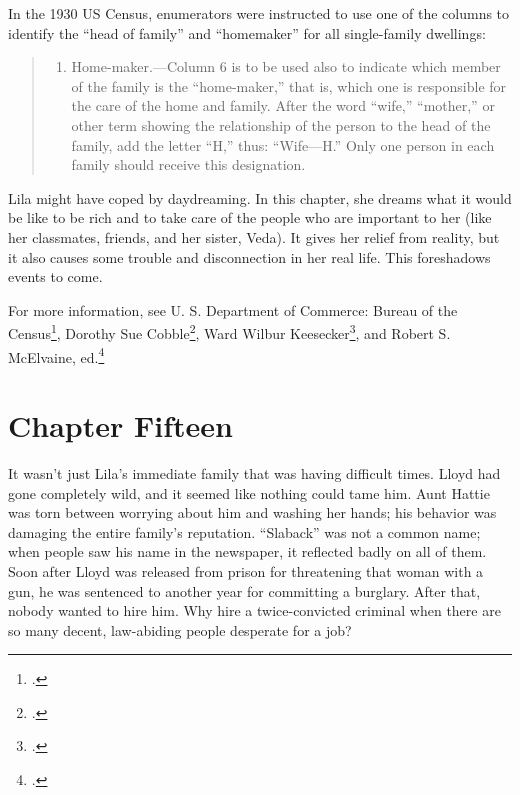 \documentclass[
  letterpaper,
]{book}
\providecommand{\tightlist}{%
  \setlength{\itemsep}{0pt}\setlength{\parskip}{0pt}}\usepackage{longtable,booktabs,array}
\begin{document}
In the 1930 US Census, enumerators were instructed to use one of the
columns to identify the ``head of family'' and ``homemaker'' for all
single-family dwellings:

\begin{quote}
\begin{enumerate}
\def\labelenumi{\arabic{enumi}.}
\setcounter{enumi}{131}
\tightlist
\item
  Home-maker.---Column 6 is to be used also to indicate which member of
  the family is the ``home-maker,'' that is, which one is responsible
  for the care of the home and family. After the word ``wife,''
  ``mother,'' or other term showing the relationship of the person to
  the head of the family, add the letter ``H,'' thus: ``Wife---H.'' Only
  one person in each family should receive this designation.
\end{enumerate}
\end{quote}

Lila might have coped by daydreaming. In this chapter, she dreams what
it would be like to be rich and to take care of the people who are
important to her (like her classmates, friends, and her sister, Veda).
It gives her relief from reality, but it also causes some trouble and
disconnection in her real life. This foreshadows events to come.

For more information, see U. S. Department of Commerce: Bureau of the
Census\footnote{.}, Dorothy Sue
Cobble\footnote{.}, Ward Wilbur
Keesecker\footnote{.}, and Robert S. McElvaine,
ed.\footnote{.}


\chapter{Chapter Fifteen}\label{chapter-fifteen}

It wasn't just Lila's immediate family that was having difficult times.
Lloyd had gone completely wild, and it seemed like nothing could tame
him. Aunt Hattie was torn between worrying about him and washing her
hands; his behavior was damaging the entire family's reputation.
``Slaback'' was not a common name; when people saw his name in the
newspaper, it reflected badly on all of them. Soon after Lloyd was
released from prison for threatening that woman with a gun, he was
sentenced to another year for committing a burglary. After that, nobody
wanted to hire him. Why hire a twice-convicted criminal when there are
so many decent, law-abiding people desperate for a job?
\end{document}
